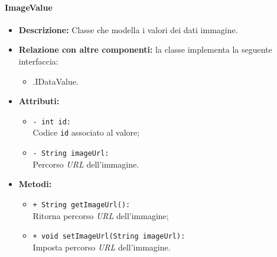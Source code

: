 \paragraph{ImageValue}
\label{botimagevalue}
\begin{flushleft}
\begin{itemize}
\item \textbf{Descrizione:} Classe che modella i valori dei dati immagine.
\item \textbf{Relazione con altre componenti:} la classe implementa la seguente interfaccia:
		\begin{itemize}
			\item \smodel{}.IDataValue.
		\end{itemize}
\item \textbf{Attributi:}
\begin{sloppypar}
\begin{itemize}
\item \texttt{- int id:}\\ Codice \texttt{id} associato al valore;
\item \texttt{- String imageUrl:}\\ Percorso \textit{URL} dell'immagine.
\end{itemize}
\end{sloppypar}
\item \textbf{Metodi:}
\begin{sloppypar}
\begin{itemize}
\item \texttt{+ String getImageUrl():}\\ Ritorna percorso \textit{URL} dell'immagine;
\item \texttt{+ void setImageUrl(String imageUrl):}\\ Imposta percorso \textit{URL} dell'immagine.
\end{itemize}
\end{sloppypar}
\end{itemize}
\end{flushleft}

